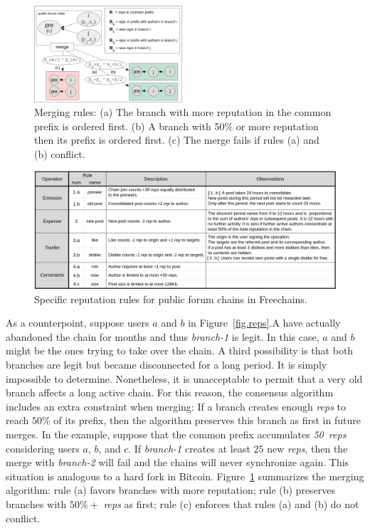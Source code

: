 \documentclass[10pt,journal,compsoc]{IEEEtran}
\newcommand{\FC}       {Freechains\xspace}
\newcommand{\reps}     {\emph{reps}\xspace}
\newcommand{\nreps}[1] {\emph{#1~reps\xspace}}
\begin{document}
\begin{figure}
\centering
\includegraphics[width=0.49\textwidth]{merge.png}
\caption{
    Merging rules:
    (a) The branch with more reputation in the common prefix is ordered first.
    (b) A branch with 50\% or more reputation then its prefix is ordered first.
    (c) The merge fails if rules (a) and (b) conflict.
}
\label{fig.merge}
\end{figure}

\begin{figure}
\centering
\includegraphics[width=\textwidth]{rules.png}
\caption{Specific reputation rules for public forum chains in \FC.}
\label{fig.rules}
\end{figure}

As a counterpoint, suppose users $a$ and $b$ in Figure~\ref{fig.reps}.A have
actually abandoned the chain for months and thus \emph{branch-1} is legit.
In this case, $a$ and $b$ might be the ones trying to take over the chain.
A third possibility is that both branches are legit but became disconnected for
a long period.
It is simply impossible to determine.
Nonetheless, it is unacceptable to permit that a very old branch affects a long
active chain.
For this reason, the consensus algorithm includes an extra constraint when
merging:
If a branch creates enough \reps to reach $50\%$ of its prefix, then the
algorithm preserves this branch as first in future merges.
In the example, suppose that the common prefix accumulates \nreps{50}
considering users $a$, $b$, and $c$.
If \emph{branch-1} creates at least $25$ new \reps, then the merge with
\emph{branch-2} will fail and the chains will never synchronize again.
This situation is analogous to a hard fork in Bitcoin.
%
Figure~\ref{fig.merge} summarizes the merging algorithm:
    rule (a) favors branches with more reputation;
    rule (b) preserves branches with $50\%+$ \reps as first;
    rule (c) enforces that rules (a) and (b) do not conflict.
\end{document}
